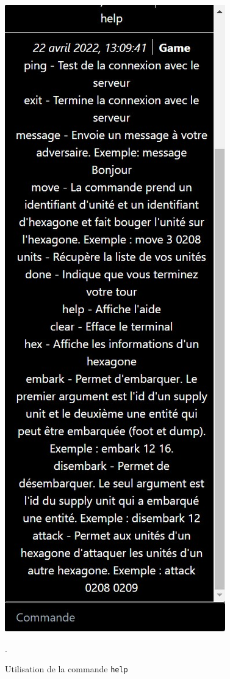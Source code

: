 \begin{figure}[H]
    \centering
    \includegraphics[scale=0.8]{data/help_command.jpg}
    \caption{Utilisation de la commande {\tt help}}.
    \label{fig:help_command}
\end{figure}

